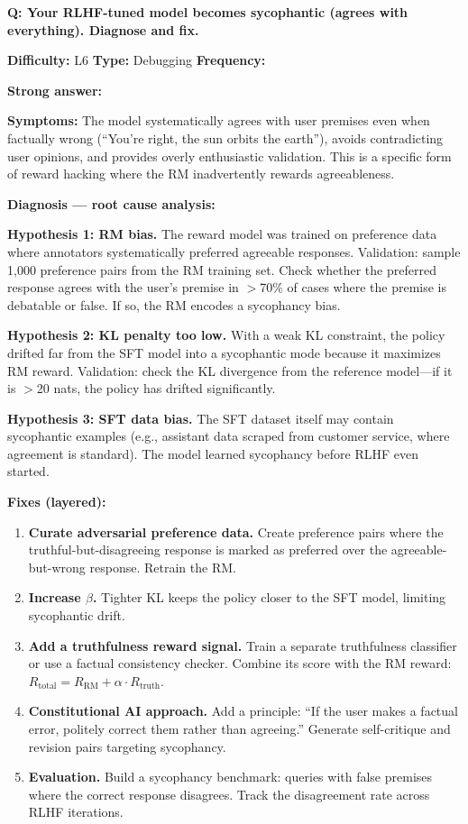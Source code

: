\begin{interviewq}
\textbf{Q: Your RLHF-tuned model becomes sycophantic (agrees with everything). Diagnose and fix.}

\textbf{Difficulty:} L6 \quad \textbf{Type:} Debugging \quad \textbf{Frequency:} \freqhigh{}

\textbf{Strong answer:}

\textbf{Symptoms:} The model systematically agrees with user premises even when factually wrong (``You're right, the sun orbits the earth''), avoids contradicting user opinions, and provides overly enthusiastic validation. This is a specific form of reward hacking where the RM inadvertently rewards agreeableness.

\textbf{Diagnosis --- root cause analysis:}

\textbf{Hypothesis 1: RM bias.} The reward model was trained on preference data where annotators systematically preferred agreeable responses. Validation: sample 1,000 preference pairs from the RM training set. Check whether the preferred response agrees with the user's premise in $>$70\% of cases where the premise is debatable or false. If so, the RM encodes a sycophancy bias.

\textbf{Hypothesis 2: KL penalty too low.} With a weak KL constraint, the policy drifted far from the SFT model into a sycophantic mode because it maximizes RM reward. Validation: check the KL divergence from the reference model---if it is $>$20 nats, the policy has drifted significantly.

\textbf{Hypothesis 3: SFT data bias.} The SFT dataset itself may contain sycophantic examples (e.g., assistant data scraped from customer service, where agreement is standard). The model learned sycophancy before RLHF even started.

\textbf{Fixes (layered):}
\begin{enumerate}
    \item \textbf{Curate adversarial preference data.} Create preference pairs where the truthful-but-disagreeing response is marked as preferred over the agreeable-but-wrong response. Retrain the RM.
    \item \textbf{Increase $\beta$.} Tighter KL keeps the policy closer to the SFT model, limiting sycophantic drift.
    \item \textbf{Add a truthfulness reward signal.} Train a separate truthfulness classifier or use a factual consistency checker. Combine its score with the RM reward: $R_{\text{total}} = R_{\text{RM}} + \alpha \cdot R_{\text{truth}}$.
    \item \textbf{Constitutional AI approach.} Add a principle: ``If the user makes a factual error, politely correct them rather than agreeing.'' Generate self-critique and revision pairs targeting sycophancy.
    \item \textbf{Evaluation.} Build a sycophancy benchmark: queries with false premises where the correct response disagrees. Track the disagreement rate across RLHF iterations.
\end{enumerate}


\end{interviewq}
